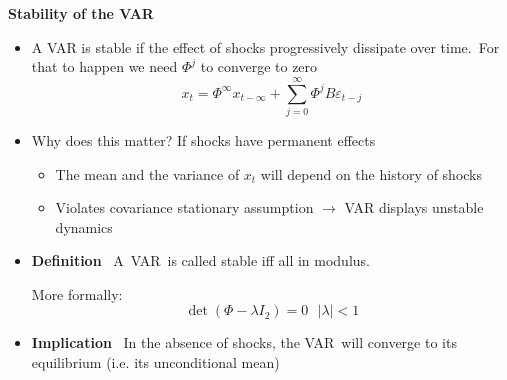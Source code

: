 
\begin{frame}
{\textbf{Stability of the VAR\vspace{-.1cm}}}

\begin{itemize}
\item A VAR is stable if the effect of shocks progressively dissipate over
time.\ For that to happen we need $\Phi ^{j}$ to converge to zero 
\begin{equation*}
x_{t}=\Phi ^{\infty }x_{t-\infty }+\sum\limits_{j=0}^{\infty }\Phi
^{j}B\varepsilon _{t-j}
\end{equation*}%
\vspace{-0.15cm}

\item Why does this matter? If shocks have permanent effects\smallskip 

\begin{itemize}
\item The mean and the variance of $x_{t}$ will depend on the history of
shocks\medskip 

\item Violates covariance stationary assumption $\rightarrow $ VAR displays
unstable dynamics \bigskip \pause
\end{itemize}

\item \textbf{Definition} \ A\ VAR\ is called stable iff all {%
} in modulus.%
\pause More formally: 
\begin{equation*}
\det \left( \Phi -\lambda I_{2}\right) =0\ \ \ \left\vert \lambda
\right\vert <1
\end{equation*}%
\pause

\item \textbf{Implication} \ In the absence of shocks, the VAR\ will
converge to its equilibrium (i.e. its unconditional mean)
\end{itemize}
\end{frame}


